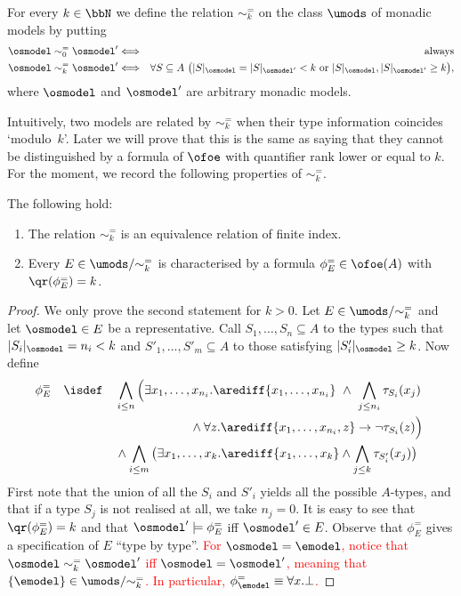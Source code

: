 \begin{definition}
For every $k \in \bbN$ we define the relation $\sim^=_k$ on the class $\umods$
of monadic models by putting
\begin{eqnarray*}
 \osmodel \sim^=_0 \osmodel' 
  & \Longleftrightarrow 
  & \text{always}
\\
\osmodel \sim^=_k \osmodel' &\Longleftrightarrow &
  \forall S\subseteq A \ \big(
    |S|_\osmodel = |S|_{\osmodel'} < k \text{ or } 
    |S|_\osmodel,|S|_{\osmodel'} \geq k 
    \big),
\end{eqnarray*}
where $\osmodel$ and $\osmodel'$ are arbitrary monadic models. 
\end{definition}

Intuitively, two models are related by $\sim^=_k$ when their type information 
coincides `modulo~$k$'.
Later we will prove that this is the same as saying that they cannot be 
distinguished by a formula of $\ofoe$ with quantifier rank lower or equal to
$k$. 
For the moment, we record the following properties of $\sim^=_k$.

\begin{proposition}\label{props:eqrelofoe} The following hold:
\begin{enumerate}
 pt
\item\label{props:eqrelofoe:i} The relation $\sim^=_k$ is an equivalence relation of finite index.
\item\label{props:eqrelofoe:ii} Every $E \in \umods/{\sim^=_k}$ is characterised by a formula 
   $\phi^=_E \in \ofoe(A)$ with $\qr(\phi^=_E) = k$.
\end{enumerate}
\end{proposition}

\begin{proof}
We only prove the second statement for $k>0$.
Let $E \in \umods/{\sim^=_k}$ and let $\osmodel \in E$ be a representative. 
Call $S_1,\dots,S_n \subseteq A$ to the types such that $|S_i|_\osmodel = n_i< k$
and $S'_1,\dots,S'_m \subseteq A$ to those satisfying $|S'_i|_\osmodel \geq k$. 
Now define
\begin{align*}
\phi^=_E \quad \isdef \quad  
   & \bigwedge_{i\leq n} \Big(\exists x_1,\dots,x_{n_i}.
   \arediff{x_1,\dots,x_{n_i}} \ \land \ \bigwedge_{j\leq n_i} \tau_{S_i}(x_j)
\\ & \qquad\qquad\qquad \land 
   \forall z. \arediff{x_1,\dots,x_{n_i},z} \to \lnot\tau_{S_i}(z)\Big)\ 
\\ & \land \bigwedge_{i\leq m} \big(\exists x_1,\dots,x_k.\arediff{x_1,\dots,x_k} \land
    \bigwedge_{j\leq k} \tau_{S'_i}(x_j) \big)
\end{align*}
%
First note that the union of all the $S_i$ and $S'_i$ yields all the possible 
$A$-types, and that if a type $S_{j}$ is not realised at all, we take $n_j = 0$. 
It is easy to see that $\qr(\phi^=_E) = k$ and that $\osmodel' \models 
\phi^=_E$ iff $\osmodel' \in E$. 
Observe that $\phi^=_E$ gives a specification of $E$ ``type by type''. \textcolor{red}{For $\osmodel =  \emodel$, notice that $\osmodel \sim^=_k \osmodel'$ iff $\osmodel=\osmodel'$, meaning that  $\{\emodel\} \in \umods/{\sim^=_k}$. In particular,  $\phi^=_\emodel \equiv \forall x. \bot$.}
\end{proof}

